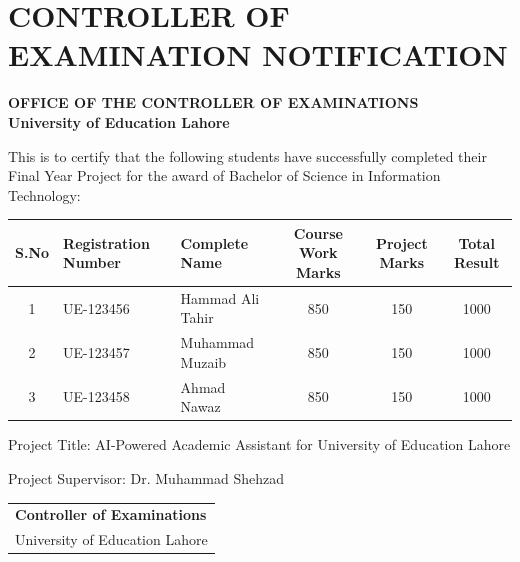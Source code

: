 \documentclass[12pt,a4paper]{book}
\numberwithin{table}{chapter}
\numberwithin{figure}{chapter}
\numberwithin{equation}{chapter}
\begin{document}
\clearpage

\chapter*{CONTROLLER OF EXAMINATION NOTIFICATION}

\bigskip
\begin{center}
\bfseries OFFICE OF THE CONTROLLER OF EXAMINATIONS\\
University of Education Lahore
\end{center}

\bigskip
This is to certify that the following students have successfully completed their Final Year Project for the award of Bachelor of Science in Information Technology:

\bigskip

\begin{table}[h]
\centering
\fontsize{11}{10}\selectfont
\begin{tabular}{|c|l|l|c|c|c|}
\hline
\textbf{S.No} & \textbf{Registration Number} & \textbf{Complete Name} & \textbf{Course Work Marks} & \textbf{Project Marks} & \textbf{Total Result}\\
\hline
1 & UE-123456 & Hammad Ali Tahir & 850 & 150 & 1000\\
\hline
2 & UE-123457 & Muhammad Muzaib & 850 & 150 & 1000\\
\hline
3 & UE-123458 & Ahmad Nawaz & 850 & 150 & 1000\\
\hline
\end{tabular}
\end{table}

\bigskip
Project Title: AI-Powered Academic Assistant for University of Education Lahore

\bigskip
Project Supervisor: Dr. Muhammad Shehzad

\bigskip\bigskip

\begin{tabular}{p{4in}}
\\[3\baselineskip]
\hline
\textbf{Controller of Examinations}\\
University of Education Lahore
\end{tabular}

\clearpage
\end{document}
